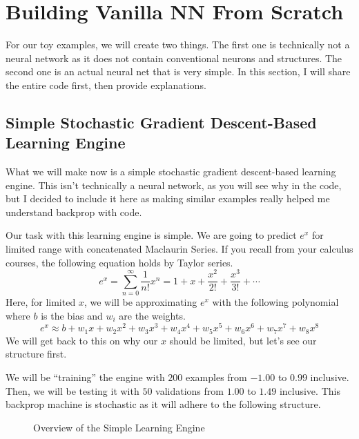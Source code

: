 \documentclass[../../main.tex]{subfiles}
\begin{document}
\section{Building Vanilla NN From Scratch}

For our toy examples, we will create two things. The first one is
technically not a neural network as it does not contain conventional
neurons and structures. The second one is an actual neural net that
is very simple. In this section, I will share the entire code first,
then provide explanations.

\subsection{Simple Stochastic Gradient Descent-Based
\texorpdfstring{\\}{ } Learning Engine}

What we will make now is a simple stochastic gradient descent-based
learning engine. This isn't technically a neural network, as you will
see why in the code, but I decided to include it here as making
similar examples really helped me understand backprop with code.

Our task with this learning engine is simple. We are going to predict
$e^x$ for limited range with concatenated Maclaurin Series.
If you recall from your calculus courses, the following equation holds
by Taylor series.
\[
e^x
= \sum_{n = 0}^\infty \frac{1}{n!} x^n
= 1 + x + \frac{x^2}{2!} + \frac{x^3}{3!} + \cdots
\]
Here, for limited $x$, we will be approximating $e^x$ with the
following polynomial where $b$ is the bias and $w_i$ are the
weights.
\[
e^x
\approx b + w_1x + w_2x^2 + w_3x^3 + w_4x^4 + w_5x^5 + w_6x^6
    + w_7x^7 + w_8x^8
\]
We will get back to this on why our $x$ should be limited, but let's
see our structure first.

We will be ``training'' the engine with $200$ examples from $-1.00$ to
$0.99$ inclusive. Then, we will be testing it with $50$ validations
from $1.00$ to $1.49$ inclusive. This backprop machine is stochastic
as it will adhere to the following structure.

\begin{figure}[H]
\centering
{}
\caption{Overview of the Simple Learning Engine}
\end{figure}
\end{document}
